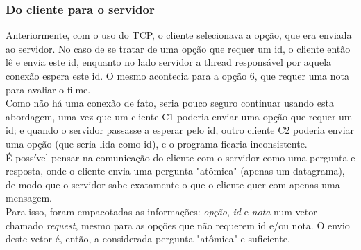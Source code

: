 \documentclass[11pt,twoside]{article}
\begin{document}
\subsubsection{Do cliente para o servidor}
Anteriormente, com o uso do TCP, o cliente selecionava a opção, que era enviada ao servidor. No caso de se tratar de uma opção que requer um id, o cliente então lê e envia este id, enquanto no lado servidor a thread responsável por aquela conexão espera este id. O mesmo acontecia para a opção 6, que requer uma nota para avaliar o filme.\\
Como não há uma conexão de fato, seria pouco seguro continuar usando esta abordagem, uma vez que um cliente C1 poderia enviar uma opção que requer um id; e quando o servidor passasse a esperar pelo id, outro cliente C2 poderia enviar uma opção (que seria lida como id), e o programa ficaria inconsistente.\\
É possível pensar na comunicação do cliente com o servidor como uma pergunta e resposta, onde o cliente envia uma pergunta "atômica" (apenas um datagrama), de modo que o servidor sabe exatamente o que o cliente quer com apenas uma mensagem.\\
Para isso, foram empacotadas as informações: \textit{opção}, \textit{id} e \textit{nota} num vetor chamado \textit{request}, mesmo para as opções que não requerem id e/ou nota. O envio deste vetor é, então, a considerada pergunta "atômica" e suficiente.
\end{document}
